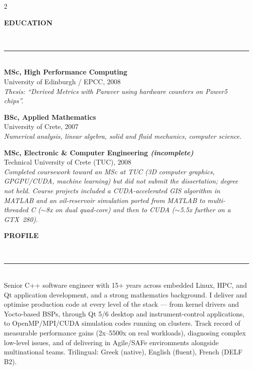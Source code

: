 \documentclass[10pt,A4]{article}
\newcommand{\cvsection}[1] {
    \vspace{14pt}
    {\raggedright\textbf{\LARGE{\textcolor{darkcol}{\uppercase{#1}}}}}\\
    \textcolor{maincol}{ \rule{0.1\linewidth}{2pt} } \\
}
\begin{document}
\begin{paracol}{2}
\begin{leftcolumn}
\begin{minipage}[t]{\linewidth}
\cvsection{EDUCATION}

\textbf{MSc, High Performance Computing}\\
University of Edinburgh / EPCC, 2008\\
\textit{\small Thesis: ``Derived Metrics with Paraver using hardware counters on Power5 chips''.}\\
\vspace{6pt}

\textbf{BSc, Applied Mathematics}\\
University of Crete, 2007\\
\textit{\small Numerical analysis, linear algebra, solid and fluid mechanics, computer science.}\\
\vspace{6pt}

\textbf{MSc, Electronic \& Computer Engineering \textit{(incomplete)}}\\
Technical University of Crete (TUC), 2008\\
\textit{\small Completed coursework toward an MSc at TUC (3D computer graphics, GPGPU/CUDA, machine learning) but did not submit the dissertation; degree not held. Course projects included a CUDA-accelerated GIS algorithm in MATLAB and an oil-reservoir simulation ported from MATLAB to multi-threaded C ($\sim$8x on dual quad-core) and then to CUDA ($\sim$5.5x further on a GTX~280).}\\
\vspace{10pt}
\end{minipage}

\end{leftcolumn}

\begin{rightcolumn}

\cvsection{PROFILE}
Senior C++ software engineer with 15+ years across embedded Linux, HPC, and Qt application development, and a strong mathematics background. I deliver and optimise production code at every level of the stack --- from kernel drivers and Yocto-based BSPs, through Qt 5/6 desktop and instrument-control applications, to OpenMP/MPI/CUDA simulation codes running on clusters. Track record of measurable performance gains (2x--5500x on real workloads), diagnosing complex low-level issues, and of delivering in Agile/SAFe environments alongside multinational teams. Trilingual: Greek (native), English (fluent), French (DELF B2).\\
\vspace{6pt}


\end{rightcolumn}
\end{paracol}
\end{document}

